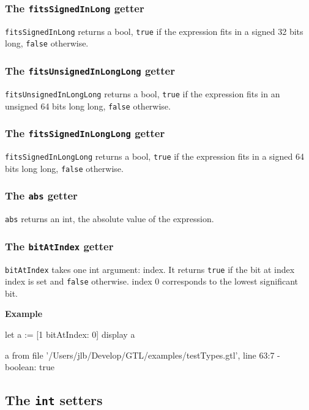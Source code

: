 \documentclass[10pt,openright,twosides]{report}
\newcommand{\gtlarg}[1]{{\footnotesize\ttfamily\colorbox{light-blue}{#1}}}
\newcommand{\gtlinline}[1]{\colorbox{light-blue}{\lstinline[language=gtl]{#1}}}
\newcommand{\example}{\vspace{.75em}\noindent\textbf{Example}\vspace{0em}}
\begin{document}
\subsubsection{The \texttt{fitsSignedInLong} getter}

\gtlinline{fitsSignedInLong} returns a bool, \gtlinline{true} if the expression fits in a signed 32 bits long, \gtlinline{false} otherwise.

\subsubsection{The \texttt{fitsUnsignedInLongLong} getter}

\gtlinline{fitsUnsignedInLongLong} returns a bool, \gtlinline{true} if the expression fits in an unsigned 64 bits long long, \gtlinline{false} otherwise.

\subsubsection{The \texttt{fitsSignedInLongLong} getter}

\gtlinline{fitsSignedInLongLong} returns a bool, \gtlinline{true} if the expression fits in a signed 64 bits long long, \gtlinline{false} otherwise.

\subsubsection{The \texttt{abs} getter}

\gtlinline{abs} returns an int, the absolute value of the expression.

\subsubsection{The \texttt{bitAtIndex} getter}

\gtlinline{bitAtIndex} takes one int argument: \gtlarg{index}. It returns \gtlinline{true} if the bit at index \gtlarg{index} is set and \gtlinline{false} otherwise. \gtlarg{index} 0 corresponds to the lowest significant bit. 

\example
\begin{gtl}
let a := [1 bitAtIndex: 0]
display a
\end{gtl}
\begin{console}
a from file '/Users/jlb/Develop/GTL/examples/testTypes.gtl', line 63:7
  - boolean: true
\end{console}

\subsection{The \texttt{int} setters}
\end{document}
